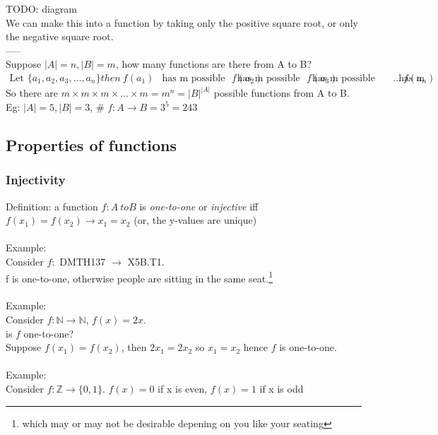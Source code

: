 TODO: diagram \\
We can make this into a function by taking only the positive square root, or only the negative square root. \\
----- \\
Suppose $|A| = n, |B| = m$, how many functions are there from A to B?
\begin{align}
  \text{Let } \{a_1, a_2, a_3, \ldots , a_n\} then \nonumber \
  f(a_1) & \text{has m possible values} \nonumber \
  f(a_2) & \text{has m possible values} \nonumber \
  f(a_3) & \text{has m possible values} \nonumber \
  \ldots \nonumber \
  f(a_n) & \text{has m possible values} \nonumber \
\end{align}
So there are $m \times m \times m \times \ldots \times m = m^n = |B|^{|A|}$ possible
functions from A to B. \\
Eg: $|A|=5, |B| = 3$,  \# $f: A \to B = 3^5 = 243$

\subsection{Properties of functions}
\subsubsection{Injectivity}
Definition: a function $f: A\ to B$ is \emph{one-to-one} or \emph{injective} iff
$f(x_1) = f(x_2) \to x_1 = x_2$ (or, the y-values are unique) \\
\\
Example: \\
Consider $f:$ DMTH137 $\to$ X5B.T1. \\
f is one-to-one, otherwise people are sitting in the same seat.\footnote{which
may or may not be desirable depening on you like your seating} \\
\\
Example: \\
Consider $f: \mathbb{N} \to \mathbb{N}$, $f(x) = 2x$. \\
is $f$ one-to-one? \\
Suppose $f(x_1) = f(x_2)$, then $2x_1 = 2x_2$ so $x_1 = x_2$ hence $f$ is one-to-one. \\
 \\
Example: \\
Consider $f: \mathbb{Z} \to \{0,1\}$. $f(x) = 0$ if x is even, $f(x) = 1$ if x is odd \\

